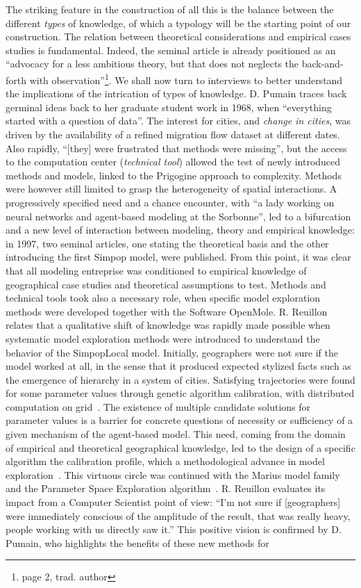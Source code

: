 \documentclass[runningheads,a4paper]{llncs2e/llncs}
\begin{document}
The striking feature in the construction of all this is the balance between the different \emph{types} of knowledge, of which a typology will be the starting point of our construction. The relation between theoretical considerations and empirical cases studies is fundamental. Indeed, the seminal article \cite{pumain1997pour} is already positioned as an ``advocacy for a less ambitious theory, but that does not neglects the back-and-forth with observation''\footnote{page 2, trad. author}. We shall now turn to interviews to better understand the implications of the intrication of types of knowledge. D. Pumain traces back germinal ideas back to her graduate student work in 1968, when ``everything started with a question of data''. The interest for cities, and \emph{change in cities}, was driven by the availability of a refined migration flow dataset at different dates. Also rapidly, ``[they] were frustrated that methods were missing'', but the access to the computation center (\emph{technical tool}) allowed the test of newly introduced methods and models, linked to the Prigogine approach to complexity. Methods were however still limited to grasp the heterogeneity of spatial interactions. A progressively specified need and a chance encounter, with ``a lady working on neural networks and agent-based modeling at the Sorbonne'', led to a bifurcation and a new level of interaction between modeling, theory and empirical knowledge: in 1997, two seminal articles, one stating the theoretical basis and the other introducing the first Simpop model, were published. From this point, it was clear that all modeling entreprise was conditioned to empirical knowledge of geographical case studies and theoretical assumptions to test. Methods and technical tools took also a necessary role, when specific model exploration methods were developed together with the Software OpenMole. R. Reuillon relates that a qualitative shift of knowledge was rapidly made possible when systematic model exploration methods were introduced to understand the behavior of the SimpopLocal model. Initially, geographers were not sure if the model worked at all, in the sense that it produced expected stylized facts such as the emergence of hierarchy in a system of cities. Satisfying trajectories were found for some parameter values through genetic algorithm calibration, with distributed computation on grid~\cite{schmitt2014half}. The existence of multiple candidate solutions for parameter values is a barrier for concrete questions of necessity or sufficiency of a given mechanism of the agent-based model. This need, coming from the domain of empirical and theoretical geographical knowledge, led to the design of a specific algorithm the calibration profile, which a methodological advance in model exploration~\cite{reuillon2015}. This virtuous circle was continued with the Marius model family~\cite{cottineau2014evolution} and the Parameter Space Exploration algorithm~\cite{10.1371/journal.pone.0138212}. R. Reuillon evaluates its impact from a Computer Scientist point of view: ``I'm not sure if [geographers] were immediately conscious of the amplitude of the result, that was really heavy, people working with us directly saw it.'' This positive vision is confirmed by D. Pumain, who highlights the benefits of these new methods for 
\end{document}
